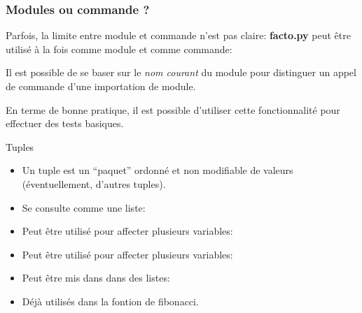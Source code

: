 \documentclass{beamer}
\begin{document}
\begin{frame}[fragile]\frametitle{Modules ou commande ?}
  Parfois, la limite entre module et commande n'est pas claire: {\bf facto.py} peut être utilisé à la fois comme module et comme commande:

  Il est possible de se baser sur le {\em nom courant} du module pour distinguer un appel de commande d'une importation de module.

  \fbox{}

  En terme de bonne pratique, il est possible d'utiliser cette fonctionnalité pour effectuer des tests basiques.
  
\end{frame}

\begin{frame}{Tuples}
  \begin{itemize}
  \item Un tuple est un ``paquet'' ordonné et non modifiable de valeurs (éventuellement, d'autres tuples).
    \newline{}
  \item Se consulte comme une liste:
    \newline{}
  \item  Peut être utilisé pour affecter plusieurs variables:
    \newline{}
  \item Peut être utilisé pour affecter plusieurs variables:
    \newline{}
  \item Peut être mis dans dans des listes:
    \newline{}
  \item Déjà utilisés dans la fontion de fibonacci.
  \end{itemize}
\end{frame}
\end{document}
